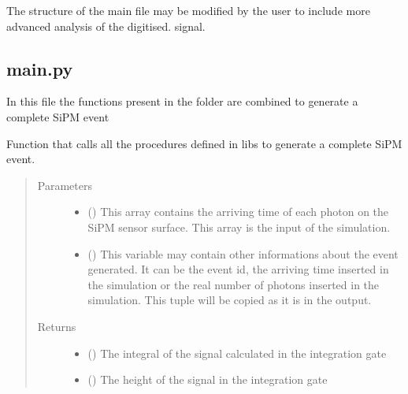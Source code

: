 \documentclass[letterpaper,10pt,english]{sphinxmanual}
\begin{document}
The structure of the main file may be modified by the user to include more advanced analysis of the digitised.  signal.


\subsection{main.py}
\label{\detokenize{structure:main-py}}
In this file the functions present in the  folder are combined to generate a complete SiPM event

\begin{fulllineitems}
\label{\detokenize{structure:main.SiPM}}
Function that calls all the procedures defined in libs to generate a complete SiPM event.
\begin{quote}\begin{description}
\item[{Parameters}] \leavevmode\begin{itemize}
\item {} 
 () \textendash{} This array contains the arriving time of each photon on the SiPM sensor surface.
This array is the input of the simulation.

\item {} 
 () \textendash{} This variable may contain other informations about the event generated.
It can be the event id, the arriving time inserted in the simulation
or the real number of photons inserted in the simulation.
This tuple will be copied as it is in the output.

\end{itemize}

\item[{Returns}] \leavevmode
\begin{itemize}
\item {} 
 () \textendash{} The integral of the signal calculated in the integration gate

\item {} 
 () \textendash{} The height of the signal in the integration gate


\end{itemize}
\end{description}
\end{quote}
\end{fulllineitems}
\end{document}
